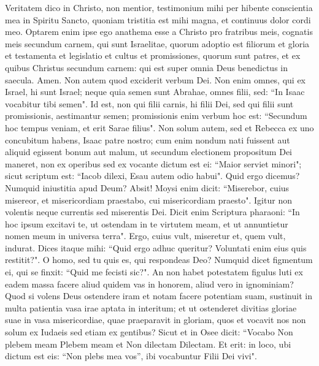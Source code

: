 \begin{biblechapter}  
\verse Veritatem dico in Christo, non mentior, testimonium mihi per hibente conscientia mea in Spiritu Sancto, 
\verse quoniam tristitia est mihi magna, et continuus dolor cordi meo. 
\verse Optarem enim ipse ego anathema esse a Christo pro fratribus meis, cognatis meis secundum carnem, 
\verse qui sunt Israelitae, quorum adoptio est filiorum et gloria et testamenta et legislatio et cultus et promissiones, 
\verse quorum sunt patres, et ex quibus Christus secundum carnem: qui est super omnia Deus benedictus in saecula. Amen. 
\verse Non autem quod exciderit verbum Dei. Non enim omnes, qui ex Israel, hi sunt Israel; 
\verse neque quia semen sunt Abrahae, omnes filii, sed: “In Isaac vocabitur tibi semen". 
\verse Id est, non qui filii carnis, hi filii Dei, sed qui filii sunt promissionis, aestimantur semen; 
\verse promissionis enim verbum hoc est: “Secundum hoc tempus veniam, et erit Sarae filius". 
\verse Non solum autem, sed et Rebecca ex uno concubitum habens, Isaac patre nostro; 
\verse cum enim nondum nati fuissent aut aliquid egissent bonum aut malum, ut secundum electionem propositum Dei maneret, 
\verse non ex operibus sed ex vocante dictum est ei: “Maior serviet minori"; 
\verse sicut scriptum est: “Iacob dilexi, Esau autem odio habui". 
\verse Quid ergo dicemus? Numquid iniustitia apud Deum? Absit! 
\verse Moysi enim dicit: “Miserebor, cuius misereor, et misericordiam praestabo, cui misericordiam praesto". 
\verse Igitur non volentis neque currentis sed miserentis Dei. 
\verse Dicit enim Scriptura pharaoni: “In hoc ipsum excitavi te, ut ostendam in te virtutem meam, et ut annuntietur nomen meum in universa terra". 
\verse Ergo, cuius vult, miseretur et, quem vult, indurat. 
\verse Dices itaque mihi: “Quid ergo adhuc queritur? Voluntati enim eius quis restitit?". 
\verse O homo, sed tu quis es, qui respondeas Deo? Numquid dicet figmentum ei, qui se finxit: “Quid me fecisti sic?". 
\verse An non habet potestatem figulus luti ex eadem massa facere aliud quidem vas in honorem, aliud vero in ignominiam? 
\verse Quod si volens Deus ostendere iram et notam facere potentiam suam, sustinuit in multa patientia vasa irae aptata in interitum;  
\verse et ut ostenderet divitias gloriae suae in vasa misericordiae, quae praeparavit in gloriam, 
\verse quos et vocavit nos non solum ex Iudaeis sed etiam ex gentibus? 
\verse Sicut et in Osee dicit: “Vocabo Non plebem meam Plebem meam et Non dilectam Dilectam. 
\verse Et erit: in loco, ubi dictum est eis: “Non plebs mea vos”, ibi vocabuntur Filii Dei vivi". 

\end{biblechapter}
